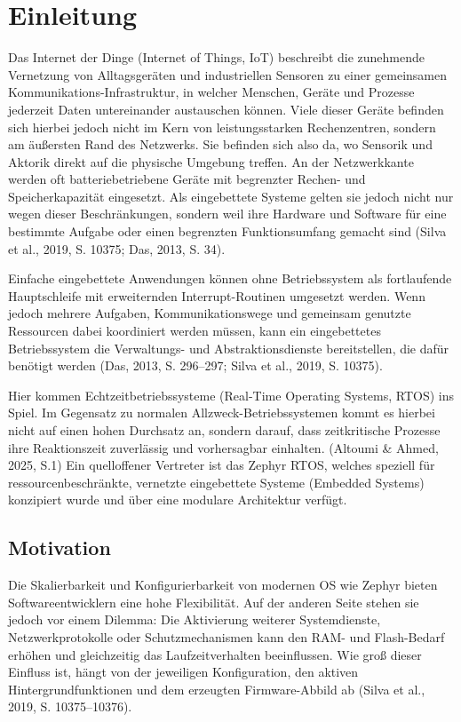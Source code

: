 \chapter{Einleitung}

Das Internet der Dinge (Internet of Things, IoT) beschreibt die zunehmende Vernetzung von Alltagsgeräten und industriellen Sensoren zu einer gemeinsamen Kommunikations-Infrastruktur, in welcher Menschen, Geräte und Prozesse jederzeit Daten untereinander austauschen können. Viele dieser Geräte befinden sich hierbei jedoch nicht im Kern von leistungsstarken Rechenzentren, sondern am äußersten Rand des Netzwerks. Sie befinden sich also da, wo Sensorik und Aktorik direkt auf die physische Umgebung treffen. An der Netzwerkkante werden oft batteriebetriebene Geräte mit begrenzter Rechen- und Speicherkapazität eingesetzt. Als eingebettete Systeme gelten sie jedoch nicht nur wegen dieser Beschränkungen, sondern weil ihre Hardware und Software für eine bestimmte Aufgabe oder einen begrenzten Funktionsumfang gemacht sind (Silva et al., 2019, S. 10375; Das, 2013, S. 34).

Einfache eingebettete Anwendungen können ohne Betriebssystem als fortlaufende Hauptschleife mit erweiternden Interrupt-Routinen umgesetzt werden. Wenn jedoch mehrere Aufgaben, Kommunikationswege und gemeinsam genutzte Ressourcen dabei koordiniert werden müssen, kann ein eingebettetes Betriebssystem die Verwaltungs- und Abstraktionsdienste bereitstellen, die dafür benötigt werden (Das, 2013, S. 296–297; Silva et al., 2019, S. 10375).

Hier kommen Echtzeitbetriebssysteme (Real-Time Operating Systems, RTOS) ins Spiel. Im Gegensatz zu normalen Allzweck-Betriebssystemen kommt es hierbei nicht auf einen hohen Durchsatz an, sondern darauf, dass zeitkritische Prozesse ihre Reaktionszeit zuverlässig und vorhersagbar einhalten. (Altoumi \& Ahmed, 2025, S.1) Ein quelloffener Vertreter ist das Zephyr RTOS, welches speziell für ressourcenbeschränkte, vernetzte eingebettete Systeme (Embedded Systems) konzipiert wurde und über eine modulare Architektur verfügt.


\section{Motivation}
Die Skalierbarkeit und Konfigurierbarkeit von modernen OS wie Zephyr bieten Softwareentwicklern eine hohe Flexibilität. Auf der anderen Seite stehen sie jedoch vor einem Dilemma: Die Aktivierung weiterer Systemdienste, Netzwerkprotokolle oder Schutzmechanismen kann den RAM- und Flash-Bedarf erhöhen und gleichzeitig das Laufzeitverhalten beeinflussen. Wie groß dieser Einfluss ist, hängt von der jeweiligen Konfiguration, den aktiven Hintergrundfunktionen und dem erzeugten Firmware-Abbild ab (Silva et al., 2019, S. 10375–10376).

